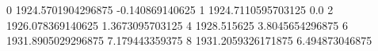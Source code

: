 0 1924.5701904296875 -0.140869140625
1 1924.7110595703125 0.0
2 1926.078369140625 1.3673095703125
4 1928.515625 3.8045654296875
6 1931.8905029296875 7.179443359375
8 1931.2059326171875 6.494873046875
